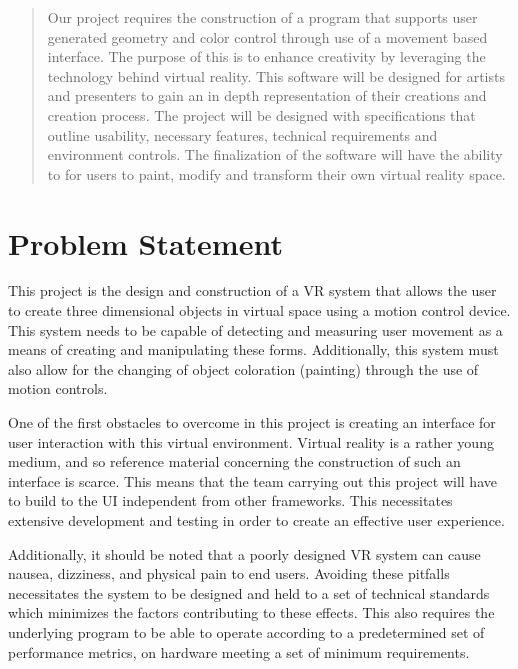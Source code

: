 \documentclass[onecolumn, draftclsnofoot,10pt, compsoc]{IEEEtran}
\begin{document}
\begin{titlepage}
\begin{singlespace}
\begin{abstract}
		 Our project requires the construction of a program that supports user generated geometry and color control through use of a movement based interface.
		 The purpose of this is to enhance creativity by leveraging the technology behind virtual reality. 
		 This software will be designed for artists and presenters to gain an in depth representation of their creations and creation process. 
		 The project will be designed with specifications that outline usability, necessary features, technical requirements and environment controls. 
		 The finalization of the software will have the ability to for users to paint, modify and transform their own virtual reality space.
        \end{abstract}     
    \end{singlespace}
\end{titlepage}
\newpage
{}
\tableofcontents
\clearpage

\section{Problem Statement}
This project is the design and construction of a VR system that allows the user to create three dimensional objects in virtual space using a motion control device.
This system needs to be capable of detecting and measuring user movement as a means of creating and manipulating these forms.
Additionally, this system must also allow for the changing of object coloration (painting) through the use of motion controls. 

One of the first obstacles to overcome in this project is creating an interface for user interaction with this virtual environment.
Virtual reality is a rather young medium, and so reference material concerning the construction of such an interface is scarce.
This means that the team carrying out this project will have to build to the UI independent from other frameworks.
This necessitates extensive development and testing in order to create an effective user experience.

Additionally, it should be noted that a poorly designed VR system can cause nausea, dizziness, and physical pain to end users.
Avoiding these pitfalls necessitates the system to be designed and held to a set of technical standards which minimizes the factors contributing to these effects.
This also requires the underlying program to be able to operate according to a predetermined set of performance metrics, on hardware meeting a set of minimum requirements. 
\end{document}
